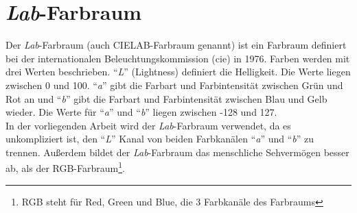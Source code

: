 \section{\textit{Lab}-Farbraum} 
Der \textit{Lab}-Farbraum (auch CIELAB-Farbraum genannt) ist ein Farbraum definiert bei der internationalen
Beleuchtungskommission (\gls{cie}) in 1976. Farben werden mit drei Werten beschrieben. ``\textit{L}'' (Lightness) definiert die Helligkeit.
Die Werte liegen zwischen 0 und 100. ``\textit{a}'' gibt die Farbart und Farbintensität zwischen Grün und Rot an und ``\textit{b}'' gibt die
Farbart und Farbintensität zwischen Blau und Gelb wieder. Die Werte für ``\textit{a}'' und ``\textit{b}'' liegen zwischen -128 und 127.
\\
In der vorliegenden Arbeit wird der \textit{Lab}-Farbraum verwendet, da es unkompliziert ist, den ``\textit{L}'' Kanal von beiden Farbkanälen
``\textit{a}'' und ``\textit{b}'' zu trennen. Außerdem bildet der \textit{Lab}-Farbraum das menschliche Sehvermögen besser ab, als der 
RGB-Farbraum\footnote{RGB steht für Red, Green und Blue, die 3 Farbkanäle des Farbraums}.

